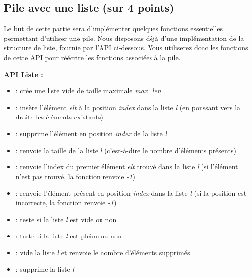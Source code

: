 \documentclass[11pt,a4paper]{article}
\begin{document}
\begin{center}
\end{center}


\clearpage


\subsection{Pile avec une liste (sur 4 points)}

\noindent Le but de cette partie sera d'implémenter quelques fonctions essentielles permettant d'utiliser une pile.
Nous disposons déjà d'une implémentation de la structure de liste, fournie par l'API ci-dessous.
Vous utiliserez donc les fonctions de cette API pour réécrire les fonctions associées à la pile.

\medskip

\noindent \textbf{API Liste :}

\begin{itemize}
\item {} : crée une liste vide de taille maximale \textit{max\_len}
\item {} : insère l'élément \textit{elt} à la position \textit{index} dans la liste \textit{l} (en poussant vers la droite les éléments existants)
\item {} : supprime l'élément en position \textit{index} de la liste \textit{l}
\item {} : renvoie la taille de la liste \textit{l} (c'est-à-dire le nombre d'éléments présents)
\item {} : renvoie l'index du premier élément \textit{elt} trouvé dans la liste \textit{l} (si l'élément n'est pas trouvé, la fonction renvoie \textit{-1})
\item {} : renvoie l'élément présent en position \textit{index} dans la liste \textit{l} (si la position est incorrecte, la fonction renvoie \textit{-1})
\item {} : teste si la liste \textit{l} est vide ou non
\item {} : teste si la liste \textit{l} est pleine ou non
\item {} : vide la liste \textit{l} et renvoie le nombre d'éléments supprimés
\item {} : supprime la liste \textit{l}
\end{itemize}
\end{document}
